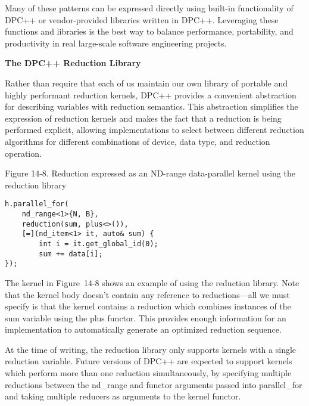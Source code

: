 Many of these patterns can be expressed directly using built-in functionality of DPC++ or vendor-provided libraries written in DPC++. Leveraging these functions and libraries is the best way to balance performance, portability, and productivity in real large-scale software engineering projects.\par

\hspace*{\fill} \par %
\textbf{The DPC++ Reduction Library}

Rather than require that each of us maintain our own library of portable and highly performant reduction kernels, DPC++ provides a convenient abstraction for describing variables with reduction semantics. This abstraction simplifies the expression of reduction kernels and makes the fact that a reduction is being performed explicit, allowing implementations to select between different reduction algorithms for different combinations of device, data type, and reduction operation.\par

\hspace*{\fill} \par %
Figure 14-8. Reduction expressed as an ND-range data-parallel kernel using the reduction library
\begin{lstlisting}[caption={}]
h.parallel_for(
	nd_range<1>{N, B},
	reduction(sum, plus<>()),
	[=](nd_item<1> it, auto& sum) {
		int i = it.get_global_id(0);
		sum += data[i];
});
\end{lstlisting}

The kernel in Figure 14-8 shows an example of using the reduction library. Note that the kernel body doesn’t contain any reference to reductions—all we must specify is that the kernel contains a reduction which combines instances of the sum variable using the plus functor. This provides enough information for an implementation to automatically generate an optimized reduction sequence.\par

At the time of writing, the reduction library only supports kernels with a single reduction variable. Future versions of DPC++ are expected to support kernels which perform more than one reduction simultaneously, by specifying multiple reductions between the nd\_range and functor arguments passed into parallel\_for and taking multiple reducers as arguments to the kernel functor.\par

